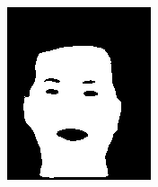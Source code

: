 \begin{figure}[h]
\begin{subfigure}[b]{0.18\textwidth}
         \includegraphics[width=\textwidth]{images/results/base_st/dd109.color.d3_skinny_4.png}
     \end{subfigure}
    \hfill
     \begin{subfigure}[b]{0.18\textwidth}
         \centering

\end{subfigure}
\end{figure}
